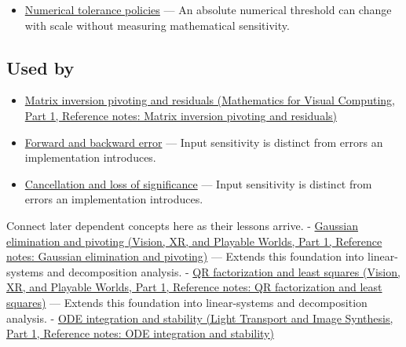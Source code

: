 \hypertarget{appendix-8f6a01f284a7-prerequisites}{}

\begin{itemize}
\tightlist
\item
  \hyperref[appendix-0ec599f8ba27]{Numerical tolerance policies} --- An absolute numerical threshold can change with scale without measuring mathematical sensitivity.
\end{itemize}

\subsection{Used by}\label{appendix-8f6a01f284a7-used-by}

\hypertarget{appendix-8f6a01f284a7-used-by}{}

\begin{itemize}
\item
  \href{../02-Mathematics-for-Visual-Computing-P01/main.pdf\#nameddest=appendix-48d2e66378ab}{Matrix inversion pivoting and residuals (Mathematics for Visual Computing, Part 1, Reference notes: Matrix inversion pivoting and residuals)}
\item
  \hyperref[appendix-a7fbaf6d1b1c]{Forward and backward error} --- Input sensitivity is distinct from errors an implementation introduces.
\item
  \hyperref[appendix-a2773a6a2f9d]{Cancellation and loss of significance} --- Input sensitivity is distinct from errors an implementation introduces.
\end{itemize}

Connect later dependent concepts here as their lessons arrive. - \href{../07-Vision-XR-and-Playable-Worlds-P01/main.pdf\#nameddest=appendix-f6e77f4a200f}{Gaussian elimination and pivoting (Vision, XR, and Playable Worlds, Part 1, Reference notes: Gaussian elimination and pivoting)} --- Extends this foundation into linear-systems and decomposition analysis. - \href{../07-Vision-XR-and-Playable-Worlds-P01/main.pdf\#nameddest=appendix-c3421e6b4f2c}{QR factorization and least squares (Vision, XR, and Playable Worlds, Part 1, Reference notes: QR factorization and least squares)} --- Extends this foundation into linear-systems and decomposition analysis. - \href{../04-Light-Transport-and-Image-Synthesis-P01/main.pdf\#nameddest=appendix-18eacf61a04b}{ODE integration and stability (Light Transport and Image Synthesis, Part 1, Reference notes: ODE integration and stability)}

